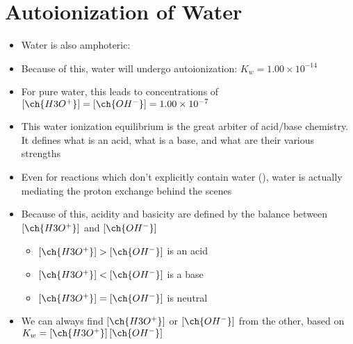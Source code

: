 \documentclass[12pt, openany, letterpaper]{memoir}
\begin{document}
\section{Autoionization of Water}
\begin{itemize}
	\item Water is also amphoteric: 
	\item Because of this, water will undergo autoionization:  \hspace{1em} $K_w=1.00\times10^{-14}$
	\item For pure water, this leads to concentrations of $\left[\ch{H3O^+}\right]=\left[\ch{OH^-}\right]=1.00\times10^{-7}$
	\item This water ionization equilibrium is the great arbiter of acid/base chemistry. It defines what is an acid, what is a base, and what are their various strengths
	\item Even for reactions which don't explicitly contain water (), water is actually mediating the proton exchange behind the scenes
	\item Because of this, acidity and basicity are defined by the balance between $\left[\ch{H3O^+}\right]$ and $\left[\ch{OH^-}\right]$
	\begin{itemize}
		\item $\left[\ch{H3O^+}\right] > \left[\ch{OH^-}\right]$ is an acid
		\item $\left[\ch{H3O^+}\right] < \left[\ch{OH^-}\right]$ is a base
		\item $\left[\ch{H3O^+}\right] = \left[\ch{OH^-}\right]$ is neutral
	\end{itemize}
	\item We can always find $\left[\ch{H3O^+}\right]$ or $\left[\ch{OH^-}\right]$ from the other, based on $K_w = \left[\ch{H3O^+}\right]\left[\ch{OH^-}\right]$
\end{itemize}
\end{document}

